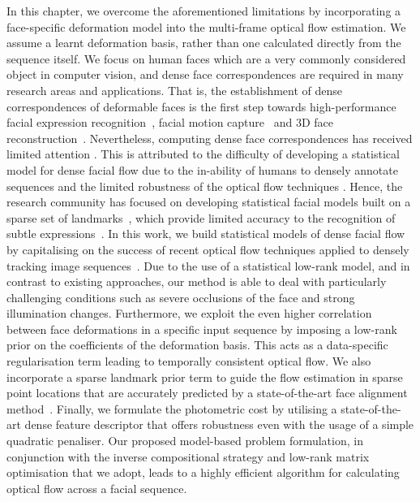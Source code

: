 In this chapter, we overcome the aforementioned limitations by incorporating a face-specific 
deformation model into the multi-frame optical flow estimation. We assume a learnt 
deformation basis, rather than one calculated directly from the sequence itself. We 
focus on human faces which are a very commonly considered object in computer vision, 
and dense face correspondences are required in many research areas and applications. 
That is, the establishment of dense correspondences of deformable faces is the first step 
towards high-performance facial expression recognition~\cite{koelstra2010dynamic},
facial motion capture~\cite{Beeler:2011ey} and 3D face reconstruction~\cite{garg2013dense}. 
Nevertheless, computing dense face correspondences has received limited attention 
\cite{decarlo2000optical,yacoob1996recognizing}. This is attributed to the difficulty of 
developing a statistical model for dense facial flow due to the in-ability of humans to 
densely annotate sequences and the limited robustness of the optical flow techniques 
\cite{decarlo2000optical}. Hence, the research community has focused on developing 
statistical facial models built on a sparse set of landmarks~\cite{xiong2013supervised}, 
which provide limited accuracy to the recognition of subtle expressions~\cite{li2013spontaneous}. 
In this work, we build statistical models of dense facial flow by capitalising
on the success of recent optical flow techniques applied to densely tracking 
image sequences~\cite{garg2013variational}. Due to the use of a statistical 
low-rank model, and in contrast to existing approaches, our method is able to deal with 
particularly challenging conditions such as severe occlusions of the face and strong 
illumination changes. Furthermore, we exploit the even higher correlation 
between face deformations in 
a specific input sequence by imposing a low-rank prior on the coefficients of the 
deformation basis. This acts as a data-specific regularisation term leading to 
temporally consistent optical flow.
We also incorporate a sparse landmark prior term to guide the flow estimation in sparse 
point locations that are accurately predicted by a state-of-the-art face 
alignment method~\cite{kazemi2014one}.
Finally, we formulate the photometric cost by utilising a state-of-the-art dense 
feature descriptor that offers robustness even with the usage of a simple quadratic 
penaliser.
Our proposed model-based problem formulation, in conjunction with the inverse 
compositional strategy and low-rank matrix optimisation that we adopt, leads to a 
highly efficient algorithm for calculating optical flow across a facial sequence.
